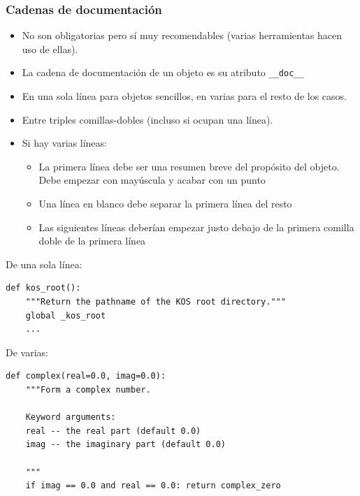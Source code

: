 \documentclass{beamer}
\begin{document}
\begin{frame}[fragile]
\frametitle{Cadenas de documentación}

\begin{small}
\begin{itemize}
\item No son obligatorias pero sí muy recomendables (varias
  herramientas hacen uso de ellas).
\item La cadena de documentación de un objeto es su atributo
  \verb|__doc__|
\item En una sola línea para objetos sencillos, en varias para el
  resto de los casos.
\item Entre triples comillas-dobles (incluso si ocupan una línea).
\item Si hay varias líneas:
  \begin{itemize}
  \item La primera línea debe ser una resumen breve del propósito del
    objeto. Debe empezar con mayúscula y acabar con un punto
  \item Una línea en blanco debe separar la primera línea del resto
  \item Las siguientes líneas deberían empezar justo debajo de la
    primera comilla doble de la primera línea
\end{itemize}
\end{itemize}
\end{small}
\end{frame}



\begin{frame}[fragile]

De una sola línea:
\begin{small}
\begin{verbatim}
def kos_root():
    """Return the pathname of the KOS root directory."""
    global _kos_root
    ...
\end{verbatim}
\end{small}

De varias:
\begin{small}
\begin{verbatim}
def complex(real=0.0, imag=0.0):
    """Form a complex number.

    Keyword arguments:
    real -- the real part (default 0.0)
    imag -- the imaginary part (default 0.0)

    """
    if imag == 0.0 and real == 0.0: return complex_zero
\end{verbatim}
\end{small}
  
\end{frame}
\end{document}
